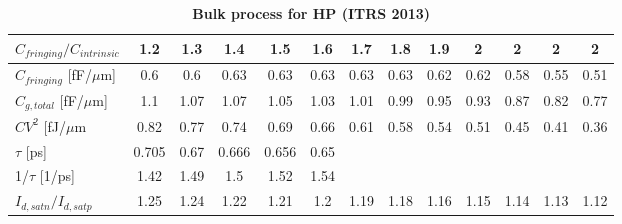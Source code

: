 \documentclass[a4paper, 12pt, twoside, openright]{report}
\begin{document}
\begin{table}[h]
{\begin{tabular}{||l||c|c|c|c|c|c|c|c|c|c|c|c||}
\hline
$C_{fringing}/C_{intrinsic}$ &1.2&1.3&1.4&1.5&1.6&1.7&1.8&1.9&2&2&2&2\\
\hline
$C_{fringing}$ [fF/$\mu$m]&0.6&0.6&0.63&0.63&0.63&0.63&0.63&0.62&0.62&0.58&0.55&0.51\\
\hline
$C_{g,total}$ [fF/$\mu$m]&1.1&1.07&1.07&1.05&1.03&1.01&0.99&0.95&0.93&0.87&0.82&0.77\\
\hline
$CV^{2}$ [fJ/$\mu$m&0.82&0.77&0.74&0.69&0.66&0.61&0.58&0.54&0.51&0.45&0.41&0.36\\
\hline
$\tau$ [ps]&0.705&0.67&0.666&0.656&0.65&&&&&&&\\
\hline
1/$\tau$ [1/ps]&1.42&1.49&1.5&1.52&1.54&&&&&&&\\
\hline
$I_{d,satn}/I_{d,satp}$&1.25&1.24&1.22&1.21&1.2&1.19&1.18&1.16&1.15&1.14&1.13&1.12\\
\hline
\end{tabular}}
\caption{\textbf{Bulk process for HP (ITRS 2013)}}
\end{table}
\end{document}
